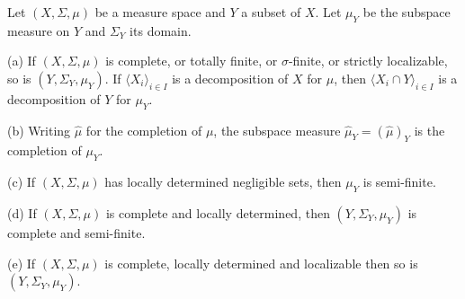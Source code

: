 Let $(X,\Sigma,\mu)$ be a measure
space and $Y$ a subset of $X$.   Let $\mu_Y$ be the subspace measure on
$Y$ and $\Sigma_Y$ its domain.

(a) If $(X,\Sigma,\mu)$ is complete, or totally finite, or
$\sigma$-finite, or strictly localizable, so is $(Y,\Sigma_Y,\mu_Y)$.
If $\langle X_i\rangle_{i\in I}$ is a decomposition of $X$ for $\mu$,
then $\langle X_i\cap Y\rangle_{i\in I}$ is a decomposition of $Y$ for
$\mu_Y$.

(b)
Writing $\hat\mu$ for the completion of $\mu$, the subspace measure
$\hat\mu_Y=(\hat\mu)_Y$ is the completion of $\mu_Y$.

(c) If $(X,\Sigma,\mu)$ has locally determined negligible sets,
then $\mu_Y$ is semi-finite.

(d) If $(X,\Sigma,\mu)$ is complete and locally determined, then
$(Y,\Sigma_Y,\mu_Y)$ is complete and semi-finite.

(e) If $(X,\Sigma,\mu)$ is complete, locally determined and localizable
then so is $(Y,\Sigma_Y,\mu_Y)$.


